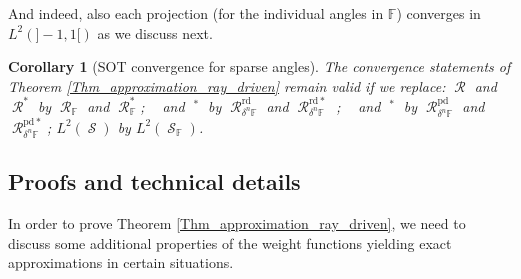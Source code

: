 \documentclass[11pt,reqno]{amsart}
\DeclareMathOperator{\Radon}{\mathcal{R}}
\DeclareMathOperator{\RayRadonN}{\mathcal{R}^\mathrm{rd}_{\delta^n}}
\DeclareMathOperator{\PixelRadonN}{\mathcal{R}^\mathrm{pd}_{\delta^n}}
\DeclareMathOperator{\sinodom}{\mathcal{S}}
\numberwithin{theorem}{section}
\newtheorem{corollary}[theorem]{Corollary}
\theoremstyle{remark}
\begin{document}
And indeed, also each projection (for the individual angles in $\mathbb{F}$) converges in $L^2(]-1,1[)$ as we discuss next.
\begin{corollary}[SOT convergence for sparse angles]
\label{thm_convergence_sparse_angle}
The convergence statements of Theorem \ref{Thm_approximation_ray_driven} remain valid if we replace:
$\Radon$ and $\Radon^*$ by $\Radon_{\mathbb{F}}$ and $\Radon_{\mathbb{F}}^*$; $\RayRadonN$ and $\RayRadonN^*$ by $\Radon_{\delta^n {\mathbb{F}}}^\mathrm{rd}$ and $\Radon_{\delta^n {\mathbb{F}}}^\mathrm{rd*}$ ; $\PixelRadonN$ and $\PixelRadonN^*$ by $\Radon_{\delta^n {\mathbb{F}}}^\mathrm{pd}$ and $\Radon_{\delta^n {\mathbb{F}}}^\mathrm{pd*}$; $L^2(\sinodom)$ by $L^2(\sinodom_{\mathbb{F}})$.
\end{corollary}
















\subsection{Proofs and technical details}
\label{section_proofs}

In order to prove Theorem \ref{Thm_approximation_ray_driven}, we need to discuss  some additional properties of the weight functions yielding exact approximations in certain situations.
\end{document}
